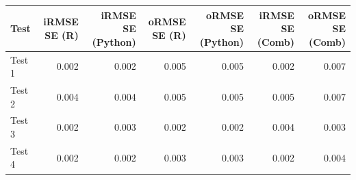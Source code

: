 
\begin{tabular}{l|r|r|r|r|r|r}
\hline
Test & iRMSE SE (R) & iRMSE SE (Python) & oRMSE SE (R) & oRMSE SE (Python) & iRMSE SE (Comb) & oRMSE SE (Comb)\\
\hline
Test 1 & 0.002 & 0.002 & 0.005 & 0.005 & 0.002 & 0.007\\
\hline
Test 2 & 0.004 & 0.004 & 0.005 & 0.005 & 0.005 & 0.007\\
\hline
Test 3 & 0.002 & 0.003 & 0.002 & 0.002 & 0.004 & 0.003\\
\hline
Test 4 & 0.002 & 0.002 & 0.003 & 0.003 & 0.002 & 0.004\\
\hline
\end{tabular}
